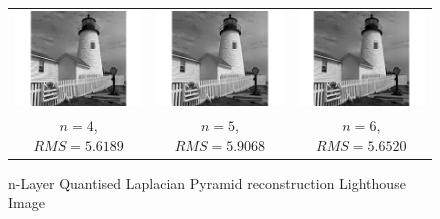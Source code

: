 \documentclass{article}					%
\begin{document}
\begin{figure}[ht!]
\begin{centering}
\begin{tabular}{c c c}
  \includegraphics{16} & \includegraphics{17} & \includegraphics{18}\\
  $n=4$,  $RMS = 5.6189$ & $n=5$, $RMS = 5.9068$ & $n=6$, $RMS = 5.6520$\\
\end{tabular}
\caption{n-Layer Quantised Laplacian Pyramid reconstruction Lighthouse Image}
\end{centering}
\end{figure}
\end{document}
